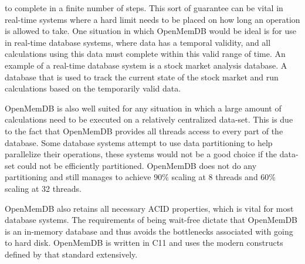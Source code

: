 \documentclass[conference, compsoc]{IEEEtran}
\newcommand{\CC}{C\nolinebreak\hspace{-.05em}\raisebox{.4ex}{\tiny\bf +}\nolinebreak\hspace{-.10em}\raisebox{.4ex}{\tiny\bf +}}
\begin{document}
to complete in a finite number of steps. This sort of guarantee can be vital in 
real-time systems where a hard limit needs to be placed on how long an operation 
is allowed to take. One situation in which OpenMemDB would be ideal is for use in real-time 
database systems, where data has a temporal validity, and all calculations using this data 
must complete within this valid range of time. An example of a real-time database system 
is a stock market analysis database. A database that is used to track the current state
of the stock market and run calculations based on the temporarily valid data. 
\par\vspace{\baselineskip}
OpenMemDB
is also well suited for any situation in which a large amount of calculations need to be 
executed on a relatively centralized data-set. This is due to the fact that OpenMemDB 
provides all threads access to every part of the database. Some database systems attempt to 
use data partitioning to help parallelize their operations, these systems would not be a 
good choice if the data-set could not be efficiently partitioned. OpenMemDB does not do any 
partitioning and still manages to achieve 90\% scaling at 8 threads and 60\% scaling at 32 
threads. 
\par\vspace{\baselineskip}
OpenMemDB also retains all necessary ACID properties, which is vital for most database systems. 
The requirements of being wait-free dictate that 
OpenMemDB is an in-memory database and thus avoids the bottlenecks associated with 
going to hard disk. OpenMemDB is written in \CC 11 and uses the modern constructs defined by 
that standard extensively.
\par\vspace{\baselineskip}
\end{document}
